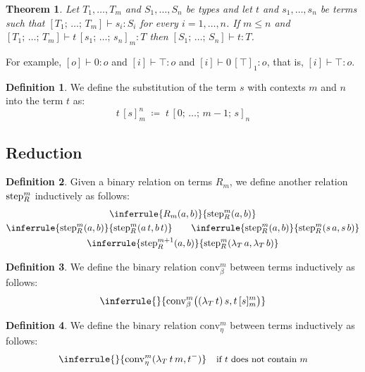 \documentclass[a4paper]{article}
\newtheorem{theorem}{Theorem}
\theoremstyle{definition}
\newtheorem{definition}{Definition}
\newcommand*{\inddef}[2]{#1 \; \coloneq \; #2}
\newcommand*{\typrp}{o}
\newcommand*{\tyind}{i}
\newcommand*{\tpquant}[2]{#1_{#2}}
\newcommand*{\tmapp}[2]{#1 \, #2}
\newcommand*{\tmabs}[2]{\tpquant{\lambda}{#1} \, #2}
\newcommand*{\hastype}[3]{#1 \vdash #2 : #3}
\newcommand*{\infcondr}[1]{\quad \text{\small #1}}
\newcommand*{\decrbound}[1]{#1^-}
\newcommand*{\subst}[3]{#1 \, [#3]_{#2}}
\newcommand*{\substl}[4]{#4 \, [#3]_{#1}^{#2}}
\newcommand*{\listdelim}[1]{[#1]}
\newcommand*{\listsep}{; \,}
\newcommand*{\dotlist}[3]{#1_{#2}, \dots, #1_{#3}}
\newcommand*{\step}[3]{\mathrm{step}_{#1}^{#2}#3}
\newcommand*{\betaconv}[2]{\mathrm{conv}_{\beta}^{#1}#2}
\newcommand*{\etaconv}[2]{\mathrm{conv}_{\eta}^{#1}#2}
\begin{document}
\begin{theorem}
    Let $\dotlist{T}{1}{m}$ and $\dotlist{S}{1}{n}$ be types and let $t$ and $\dotlist{s}{1}{n}$ be terms such that $\hastype{\listdelim{T_1 \listsep \dots \listsep T_m}}{s_i}{S_i}$ for every $i = 1, \dots, n$.
    If $m \le n$ and $\hastype{\listdelim{T_1 \listsep \dots \listsep T_m}}{\subst{t}{m}{s_1 \listsep \dots \listsep s_n}}{T}$
    then $\hastype{\listdelim{S_1 \listsep \dots \listsep S_n}}{t}{T}$.
\end{theorem}

For example, $\hastype{\listdelim{\typrp}}{0}{\typrp}$ and $\hastype{\listdelim{\tyind}}{\top}{\typrp}$ and $\hastype{\listdelim{\tyind}}{\subst{0}{1}{\top}}{\typrp}$, that is, $\hastype{\listdelim{\tyind}}{\top}{\typrp}$.

\begin{definition}
    We define the substitution of the term $s$ with contexts $m$ and $n$ into the term $t$ as:
    \[
        \inddef{\substl{m}{n}{s}{t}}{\subst{t}{n}{0 \listsep \dots \listsep m-1 \listsep s}}
    \]
\end{definition}


\subsection{Reduction}

\begin{definition}
    Given a binary relation on terms $R_m$, we define another relation $\step{R}{m}$ inductively as follows:
    \begin{gather*}
        \inferrule{R_m(a, b)}{\step{R}{m}{(a, b)}} \\
        \inferrule{\step{R}{m}{(a, b)}}{\step{R}{m}{(\tmapp{a}{t}, \tmapp{b}{t})}} \qquad
        \inferrule{\step{R}{m}{(a, b)}}{\step{R}{m}{(\tmapp{s}{a}, \tmapp{s}{b})}} \\
        \inferrule{\step{R}{m+1}{(a, b)}}{\step{R}{m}{(\tmabs{T}{a}, \tmabs{T}{b})}}
    \end{gather*}
\end{definition}

\begin{definition}
    We define the binary relation $\betaconv{m}{}$ between terms inductively as follows:
    \[
        \inferrule{ }{\betaconv{m}{\bigl(\tmapp{(\tmabs{T}{t})}{s}, \substl{m}{m}{s}{t}\bigr)}}
    \]
\end{definition}

\begin{definition}
    We define the binary relation $\etaconv{m}{}$ between terms inductively as follows:
    \[
        \inferrule{ }{\etaconv{m}{(\tmabs{T}{\tmapp{t}{m}}, \decrbound{t})}} \infcondr{if $t$ does not contain $m$}
    \]
\end{definition}
\end{document}

